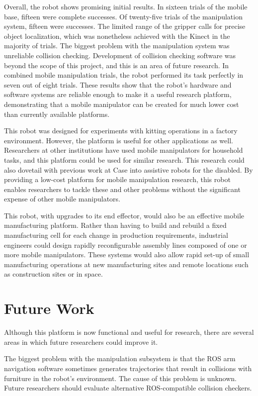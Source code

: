 \documentclass[]{cwru} %
\begin{document}
Overall, the robot shows promising initial results. In sixteen trials of
the mobile base, fifteen were complete successes. Of twenty-five trials
of the manipulation system, fifteen were successes. The limited range of
the gripper calls for precise object localization, which was nonetheless
achieved with the Kinect in the majority of trials. The biggest problem
with the manipulation system was unreliable collision checking.
Development of collision checking software was beyond the scope of this
project, and this is an area of future research. In combined mobile
manipulation trials, the robot performed its task perfectly in seven out
of eight trials. These results show that the robot's hardware and
software systems are reliable enough to make it a useful research
platform, demonstrating that a mobile manipulator can be created for
much lower cost than currently available platforms.

This robot was designed for experiments with kitting operations in a
factory environment. However, the platform is useful for other
applications as well. Researchers at other institutions have used mobile
manipulators for household tasks, and this platform could be used for
similar research. This research could also dovetail with previous work
at Case into assistive robots for the disabled. By providing a low-cost
platform for mobile manipulation research, this robot enables
researchers to tackle these and other problems without the significant
expense of other mobile manipulators.

This robot, with upgrades to its end effector, would also be an
effective mobile manufacturing platform. Rather than having to build and
rebuild a fixed manufacturing cell for each change in production
requirements, industrial engineers could design rapidly reconfigurable
assembly lines composed of one or more mobile manipulators. These
systems would also allow rapid set-up of small manufacturing operations
at new manufacturing sites and remote locations such as construction
sites or in space.

\chapter{Future Work}

Although this platform is now functional and useful for research, there
are several areas in which future researchers could improve it.

The biggest problem with the manipulation subsystem is that the ROS arm
navigation software sometimes generates trajectories that result in
collisions with furniture in the robot's environment. The cause of this
problem is unknown. Future researchers should evaluate alternative
ROS-compatible collision checkers.
\end{document}
